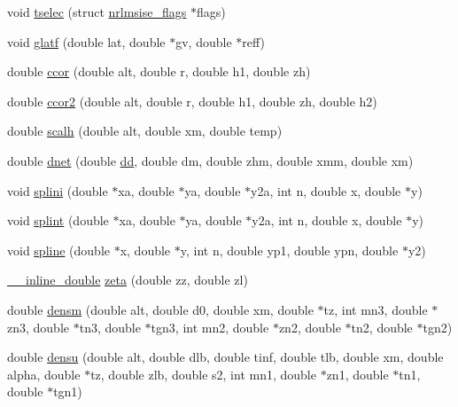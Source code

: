 \begin{DoxyCompactItemize}
\item 
void \hyperlink{nrlmsise-00_8c_a33a1cefdccd2b19639ffdf27c6a7abbd}{tselec} (struct \hyperlink{structnrlmsise__flags}{nrlmsise\+\_\+flags} $\ast$flags)
\item 
void \hyperlink{nrlmsise-00_8c_a4af6534d9215653c20526ecaaf80d9d3}{glatf} (double lat, double $\ast$gv, double $\ast$reff)
\item 
double \hyperlink{nrlmsise-00_8c_afa1fe6df744c3d47b7b91f851962b3ea}{ccor} (double alt, double r, double h1, double zh)
\item 
double \hyperlink{nrlmsise-00_8c_ac2904e7bac2f213922ad6ed41eae2b21}{ccor2} (double alt, double r, double h1, double zh, double h2)
\item 
double \hyperlink{nrlmsise-00_8c_ac9fa1e29d97fde4cb409270927779d27}{scalh} (double alt, double xm, double temp)
\item 
double \hyperlink{nrlmsise-00_8c_a4b1bfbfc1a16a9713b24e0ada4fbdd2a}{dnet} (double \hyperlink{nrlmsise-00_8c_ac47fb7efa6b9610bdc78116f1f94ec42}{dd}, double dm, double zhm, double xmm, double xm)
\item 
void \hyperlink{nrlmsise-00_8c_ace413e8af59596333e916355b54a08c7}{splini} (double $\ast$xa, double $\ast$ya, double $\ast$y2a, int n, double x, double $\ast$y)
\item 
void \hyperlink{nrlmsise-00_8c_a219484a4d3318d5361a52365d97cddc3}{splint} (double $\ast$xa, double $\ast$ya, double $\ast$y2a, int n, double x, double $\ast$y)
\item 
void \hyperlink{nrlmsise-00_8c_ae2e73ba3832c389e53954019ceb47ded}{spline} (double $\ast$x, double $\ast$y, int n, double yp1, double ypn, double $\ast$y2)
\item 
\hyperlink{nrlmsise-00_8h_ad38d2e3fa313d97ec413ff90989d9fdd}{\+\_\+\+\_\+inline\+\_\+double} \hyperlink{nrlmsise-00_8c_a2fec2cce97c98dff8ba8bc5cb3011af1}{zeta} (double zz, double zl)
\item 
double \hyperlink{nrlmsise-00_8c_a444802ef41a0aa4a3fa7a63456ba5eeb}{densm} (double alt, double d0, double xm, double $\ast$tz, int mn3, double $\ast$zn3, double $\ast$tn3, double $\ast$tgn3, int mn2, double $\ast$zn2, double $\ast$tn2, double $\ast$tgn2)
\item 
double \hyperlink{nrlmsise-00_8c_acf308b81d9ca237baf0e2ecce89c8d5b}{densu} (double alt, double dlb, double tinf, double tlb, double xm, double alpha, double $\ast$tz, double zlb, double s2, int mn1, double $\ast$zn1, double $\ast$tn1, double $\ast$tgn1)

\end{DoxyCompactItemize}
